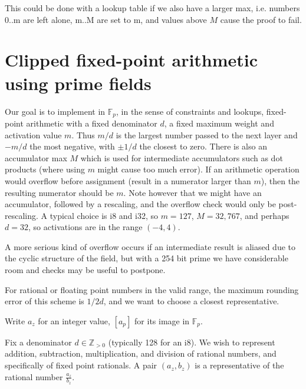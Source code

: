 \documentclass[12pt]{amsart}
\newcommand{\ZZ}{\mathbb{Z}}
\theoremstyle{plain}
\theoremstyle{definition}
\theoremstyle{definition}
\theoremstyle{definition}
\theoremstyle{definition}
\theoremstyle{definition}
\begin{document}
This could be done with a lookup table if we also have a larger max, i.e. numbers 0..m are left alone, m..M are set to m, and values above $M$ cause the proof to fail.



\section{Clipped fixed-point arithmetic using prime fields}

Our goal is to implement in $\mathbb{F}_p$, in the sense of constraints and lookups, fixed-point arithmetic with a fixed denominator $d$, a fixed maximum weight and activation value $m$.  Thus $m/d$ is the largest number passed to the next layer and $-m/d$ the most negative, with $\pm 1/d$ the closest to zero.  There is also an accumulator max $M$ which is used for intermediate accumulators such as dot products (where using $m$ might cause too much error).  If an arithmetic operation would overflow before assignment (result in a numerator larger than $m$), then the resulting numerator should be $m$.  Note however that we might have an accumulator, followed by a rescaling, and the overflow check would only be post-rescaling.  A typical choice is i8 and i32, so $m=127$, $M=32,767$, and perhaps $d=32$, so activations are in the range $(-4,4)$.

A more serious kind of overflow occurs if an intermediate result is aliased due to the cyclic structure of the field, but with a 254 bit prime we have considerable room and checks may be useful to postpone.

For rational or floating point numbers in the valid range, the maximum rounding error of this scheme is $1/2d$, and we want to choose a closest representative.


Write $a_z$ for an integer value, $[a_p]$ for its image in $\mathbb{F}_p$.

Fix a denominator $d \in \ZZ_{>0}$ (typically 128 for an i8).  We wish to represent addition, subtraction, multiplication, and division of rational numbers, and specifically of fixed point rationals. A pair $(a_z,b_z)$ is a representative of the rational number $\frac{a_z}{b_z}$.
\end{document}
